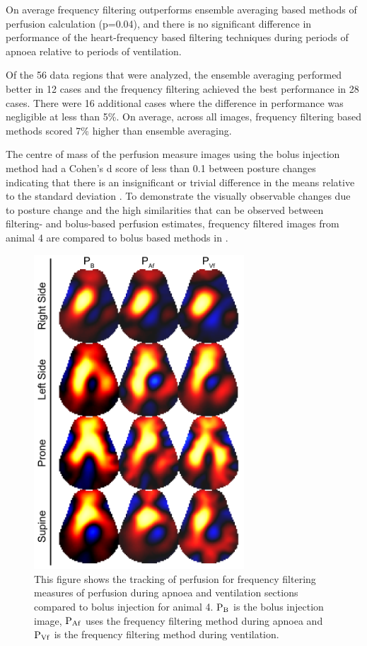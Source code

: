On average frequency filtering outperforms ensemble averaging based methods
of perfusion calculation (p=0.04), and there is no significant difference in
performance of the heart-frequency based 
filtering techniques during periods of apnoea relative to periods of ventilation.

Of the 56 data regions that were analyzed,
the ensemble averaging performed better in 12 cases and the frequency 
filtering achieved the best performance in 28 cases. There were 16 additional cases 
where the difference in performance was negligible at less than 5\%. On 
average, across all images, frequency filtering based methods scored
7\% higher than ensemble averaging.

The centre of mass of the perfusion 
measure images using the bolus injection method had a Cohen's d score of less than 0.1 
between posture changes
indicating that there is an insignificant or trivial difference in the means relative
to the standard deviation \parencite{cohen_statistical_1977}. 
To demonstrate the visually observable changes due to posture change and the 
high similarities that can be observed between filtering- and bolus-based 
perfusion estimates, frequency filtered images from 
animal 4 are compared to bolus based methods in .

\begin{figure}[H]
\centering
\includegraphics[width=0.7\textwidth]{chapter3-perfusion_analysis/imgs/fig-discussionSample.pdf}
\caption[Example perfusion images]{\label{fig:discussionSample}%
		This figure shows the tracking of perfusion for frequency filtering measures
		of perfusion during apnoea and ventilation sections compared to bolus injection
		for animal 4.
${\rm P_{B}}$ is the bolus injection image, 
${\rm P_{Af}}$ uses the frequency filtering method during apnoea and
${\rm P_{Vf}}$ is the frequency filtering method during ventilation.
}
\end{figure}

